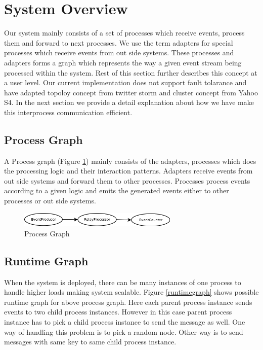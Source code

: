 \section{System Overview}
Our system mainly consists of a set of processes which receive events, process them and forward to next processes. We use the term adapters for special processes which receive events from out side systems. These processes and adapters forms a graph which represents the way a given event stream being processed within the system. Rest of this section further describes this concept at a user level. Our current implementation does not support fault tolarance and have adapted topoloy concept from twitter storm\cite{twitterStorm} and cluster concept from Yahoo S4\cite{neumeyer2010s4}. In the next section we provide a detail explanation about how we have make this interprocess communication efficient.
\subsection{Process Graph}
A Process graph (Figure \ref{processgraph}) mainly consists of the adapters, processes which does the processing logic and their interaction patterns. Adapters receive events from out side systems and forward them to other processes. Processes process events according to a given logic and emits the generated events either to other processes or out side systems. 

\begin{figure}[!t]
	\centering
	\includegraphics[width=3.0in]{processgraph.png}
	\caption{Process Graph}
	\label{processgraph}
\end{figure}

\subsection{Runtime Graph}
When the system is deployed, there can be many instances of one process to handle higher loads making system scalable. Figure \ref{runtimegraph} shows possible runtime graph for above process graph. Here each parent process instance sends events to two child process instances. However in this case parent process instance has to pick a child process instance to send the message as well. One way of handling this problem is to pick a random node. Other way is to send messages with same key to same child process instance. 

